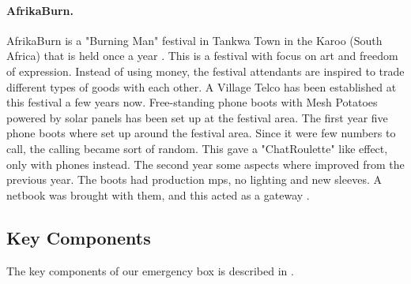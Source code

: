 \paragraph{AfrikaBurn.}
AfrikaBurn is a "Burning Man" festival in Tankwa Town in the Karoo (South Africa) that is held once a year \cite{whatisafrikaburn}. This is a festival with focus on art and freedom of expression. Instead of using money, the festival attendants are inspired to trade different types of goods with each other. A Village Telco has been established at this festival a few years now. Free-standing phone boots with Mesh Potatoes powered by solar panels has been set up at the festival area. The first year five phone boots where set up around the festival area. Since it were few numbers to call, the calling became sort of random. This gave a  "ChatRoulette" like effect, only with phones instead. The second year some aspects where improved from the previous year. The boots had production \glspl{mp}, no lighting and new sleeves. A netbook was brought with them, and this acted as a gateway \cite{africaburnforavillagetelco,africaburnsagainforavillagetelco}. 

\subsection{Key Components}
The key components of our emergency box is described in . 

